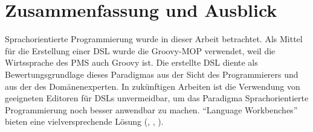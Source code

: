\documentclass[11pt,english,ngerman, headsepline]{scrreprt}
\begin{document}
\section{Zusammenfassung und Ausblick}

Sprachorientierte Programmierung wurde in dieser Arbeit betrachtet. Als
Mittel für die Erstellung einer DSL wurde die Groovy-MOP verwendet, weil die
Wirtssprache des PMS auch Groovy ist. Die erstellte DSL
diente als Bewertungsgrundlage dieses Paradigmas aus der Sicht des
Programmierers und aus der des Domänenexperten. 
In zukünftigen Arbeiten ist die Verwendung von geeigneten Editoren für DSLs 
unvermeidbar, um das Paradigma Sprachorientierte Programmierung noch besser
anwendbar zu machen.  ``Language Workbenches'' bieten eine vielversprechende
Lösung (\cite{10.1109/MS.2011.139}, \cite{fowler2005language}
 \cite{dmitriev2004}, \cite{fowler2011domain}).
    

\clearpage{}
\appendix
\renewcommand{\theequation}{A-\arabic{equation}}

\setcounter{equation}{0}  %




\end{document}
